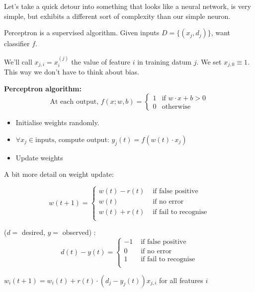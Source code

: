 Let's take a quick detour into something that looks like a neural
network, is very simple, but exhibits a different sort of complexity
than our simple neuron.

Perceptron is a supervised algorithm.  Given inputs $D = \{(x_j, d_j)\}$, want classifier $f$.

We'll call $x_{j,i} = x^{(j)}_i$ the value of feature $i$ in training datum $j$.
We set $x_{j,0}\equiv 1$.  This way we don't have to think about bias.

\textbf{Perceptron algorithm:}
\begin{displaymath}
  \mbox{At each output, }
  f(x; w, b) = \left\{
    \begin{array}{ll}
      1 & \mbox{if } w\cdot x + b > 0 \\
      0 & \mbox{otherwise}
    \end{array}
 \right.
\end{displaymath}
\begin{itemize}
\item Initialise weights randomly.
\item $\forall x_j\in \mbox{inputs}$, compute output: $y_j(t) = f(w(t)\cdot x_j)$
\item Update weights
\end{itemize}

A bit more detail on weight update:

\begin{displaymath}
w(t+1) = \left\{
\begin{array}{ll}
  w(t) - r(t) & \mbox{ if false positive} \\
  w(t) & \mbox{ if no error} \\
  w(t) + r(t) & \mbox{ if fail to recognise} \\
\end{array} \right.
\end{displaymath}

 ($d=$ desired, $y=$ observed) :
\begin{displaymath}
  d(t) - y(t) = \left\{
\begin{array}{ll}
  -1 & \mbox{ if  false positive} \\
  0 & \mbox{ if no error} \\
  1 & \mbox{ if fail to recognise} \\
\end{array} \right.
\end{displaymath}

 $w_i(t+1) = w_i(t) + r(t)\cdot (d_j - y_j(t)) x_{j,i}$ for all features $i$


